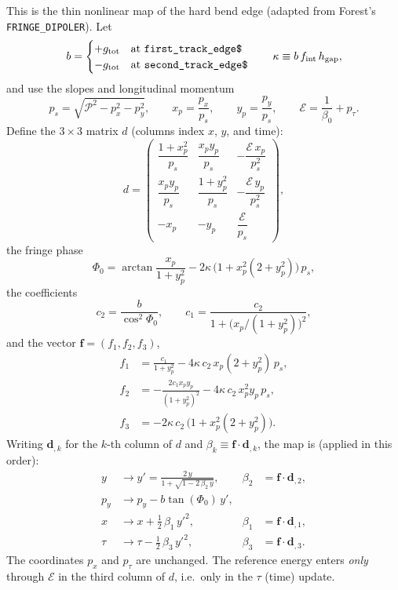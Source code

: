 \documentclass[11pt]{article}
\newcommand{\code}[1]{\texttt{#1}}
\newcommand{\ptcE}{\mathcal{E}}          %
\newcommand{\Pmag}{\mathcal{P}}          %
\newcommand{\ftrack}{\code{first\_track\_edge\$}}
\newcommand{\strack}{\code{second\_track\_edge\$}}
\begin{document}
This is the thin nonlinear map of the hard bend edge (adapted from Forest's
\code{FRINGE\_DIPOLER}). Let
\begin{equation}
  b = \begin{cases} +g_{\rm tot} & \text{at \ftrack} \\
                    -g_{\rm tot} & \text{at \strack} \end{cases}
  \qquad
  \kappa \equiv b\,f_{\rm int}\,h_{\rm gap},
\end{equation}
and use the slopes and longitudinal momentum
\begin{equation}
  p_s = \sqrt{\Pmag^2 - p_x^2 - p_y^2}, \qquad
  x_p = \frac{p_x}{p_s}, \qquad y_p = \frac{p_y}{p_s}, \qquad
  \ptcE = \frac{1}{\beta_0} + p_\tau .
\end{equation}
Define the $3\times3$ matrix $d$ (columns index $x$, $y$, and time):
\begin{equation}
  d =
  \begin{pmatrix}
    \dfrac{1+x_p^2}{p_s} & \dfrac{x_p y_p}{p_s} & -\dfrac{\ptcE\,x_p}{p_s^2} \\[8pt]
    \dfrac{x_p y_p}{p_s} & \dfrac{1+y_p^2}{p_s} & -\dfrac{\ptcE\,y_p}{p_s^2} \\[8pt]
    -x_p                 & -y_p                 &  \dfrac{\ptcE}{p_s}
  \end{pmatrix},
\end{equation}
the fringe phase
\begin{equation}
  \Phi_0 = \arctan\!\frac{x_p}{1+y_p^2}
           - 2\kappa\,\bigl(1 + x_p^2(2+y_p^2)\bigr)\,p_s ,
\end{equation}
the coefficients
\begin{equation}
  c_2 = \frac{b}{\cos^2\Phi_0}, \qquad
  c_1 = \frac{c_2}{1 + \bigl(x_p/(1+y_p^2)\bigr)^2},
\end{equation}
and the vector $\mathbf f = (f_1, f_2, f_3)$,
\begin{align}
  f_1 &= \frac{c_1}{1+y_p^2} - 4\kappa\,c_2\,x_p(2+y_p^2)\,p_s, \\
  f_2 &= -\frac{2 c_1 x_p y_p}{(1+y_p^2)^2} - 4\kappa\,c_2\,x_p^2 y_p\,p_s, \\
  f_3 &= -2\kappa\,c_2\,\bigl(1 + x_p^2(2+y_p^2)\bigr).
\end{align}
Writing $\mathbf d_{,k}$ for the $k$-th column of $d$ and
$\beta_k \equiv \mathbf f \cdot \mathbf d_{,k}$, the map is (applied in this
order):
\begin{align}
  y      &\to y' = \frac{2\,y}{1 + \sqrt{1 - 2\,\beta_2\,y}},
             & \beta_2 &= \mathbf f\cdot\mathbf d_{,2}, \\
  p_y    &\to p_y - b\tan(\Phi_0)\,y', & & \\
  x      &\to x + \tfrac12\,\beta_1\,y'^2,
             & \beta_1 &= \mathbf f\cdot\mathbf d_{,1}, \\
  \tau   &\to \tau - \tfrac12\,\beta_3\,y'^2,
             & \beta_3 &= \mathbf f\cdot\mathbf d_{,3}.
\end{align}
The coordinates $p_x$ and $p_\tau$ are unchanged. The reference energy enters
\emph{only} through $\ptcE$ in the third column of $d$, i.e.\ only in the
$\tau$ (time) update.
\end{document}
